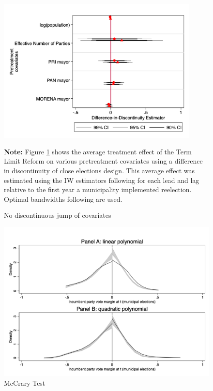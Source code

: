 \documentclass[12pt]{amsart}
\numberwithin{equation}{section}
\theoremstyle{definition}
\theoremstyle{definition}
\theoremstyle{definition}
\begin{document}
\begin{appendix}
\begin{table}[H]
{{\begin{tabular}{l*{1}{ccccc}}
\hline\hline
\end{tabular}    
}
}
\end{table} 
   


 \begin{figure}[h]   
\centering
 \caption{No discontinuous jump of covariates}
 \label{fig:jump_covariates}
\includegraphics[width=0.9\textwidth]{Figures_incumbency/nojump.png}
       \captionsetup{justification=centering}
    
 \textbf{Note:} Figure \ref{fig:jump_covariates} shows the average treatment effect of the Term Limit Reform on various pretreatment covariates using a difference in discontinuity of close elections design. This average effect was estimated using the IW estimators following \citet{abraham_sun_2020} for each lead and lag relative to the first year a municipality implemented reelection. Optimal bandwidths following \citet{calonicoetal_2014} are used. 
   
\end{figure} 

  
    
    
\begin{figure}[h]   
\centering
 \caption{McCrary Test}
 \label{fig:mccrary}
\includegraphics[width=1\textwidth]{Figures_incumbency/mccrary_pol1_2.png}


\end{figure}
\end{appendix}
\end{document}
